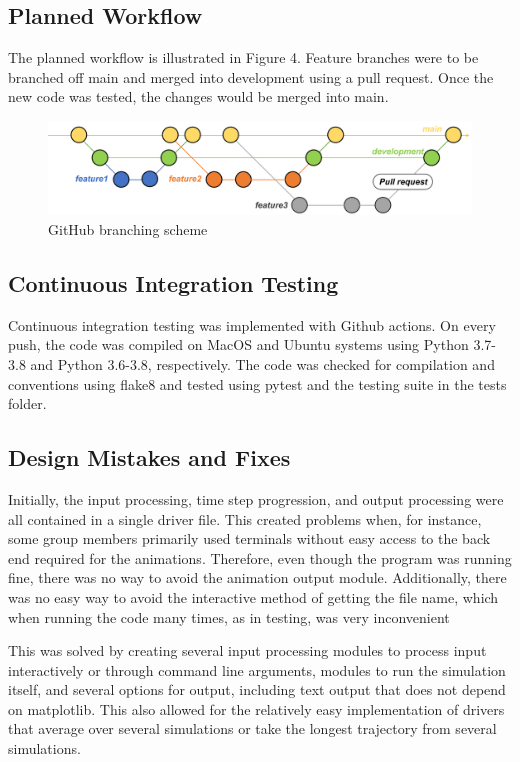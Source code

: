 \documentclass{article}
\begin{document}
\subsection{Planned Workflow}
The planned workflow is illustrated in Figure 4. Feature branches were to be branched off main and merged into development using a pull request. Once the new code was tested, the changes would be merged into main.

\begin{figure}[H]
    \centering
   \includegraphics[scale=.5]{git_workflow.png}
    \caption{GitHub branching scheme}
    \label{fig:my_label}
\end{figure}

\subsection{Continuous Integration Testing}

Continuous integration testing was implemented with Github actions. On every push, the code was compiled on MacOS and Ubuntu systems using Python 3.7-3.8 and Python 3.6-3.8, respectively. The code was checked for compilation and conventions using flake8 and tested using pytest and the testing suite in the tests folder.

\subsection{Design Mistakes and Fixes}

Initially, the input processing, time step progression, and output processing were all contained in a single driver file. This created problems when, for instance, some group members primarily used terminals without easy access to the back end required for the animations. Therefore, even though the program was running fine, there was no way to avoid the animation output module. Additionally, there was no easy way to avoid the interactive method of getting the file name, which when running the code many times, as in testing, was very inconvenient

This was solved by creating several input processing modules to process input interactively or through command line arguments, modules to run the simulation itself, and several options for output, including text output that does not depend on matplotlib. This also allowed for the relatively easy implementation of drivers that average over several simulations or take the longest trajectory from several simulations.
\end{document}
